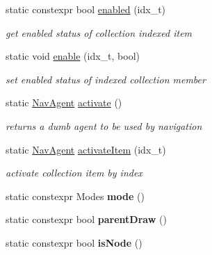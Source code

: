 \begin{DoxyCompactItemize}
static constexpr bool \hyperlink{structEmpty_adc2d105531fb7b43f60fcd9deaaaa71c}{enabled} (idx\+\_\+t)
\begin{DoxyCompactList}\small\item\em get enabled status of collection indexed item \end{DoxyCompactList}\item 
\mbox{\label{structEmpty_af4997efbad97edae86108c77b4b0f26a}} 
static void \hyperlink{structEmpty_af4997efbad97edae86108c77b4b0f26a}{enable} (idx\+\_\+t, bool)
\begin{DoxyCompactList}\small\item\em set enabled status of indexed collection member \end{DoxyCompactList}\item 
\mbox{\label{structEmpty_ade3cccf531dad6fe907c3a9764204e1c}} 
static \hyperlink{structNavAgent}{Nav\+Agent} \hyperlink{structEmpty_ade3cccf531dad6fe907c3a9764204e1c}{activate} ()
\begin{DoxyCompactList}\small\item\em returns a dumb agent to be used by navigation \end{DoxyCompactList}\item 
\mbox{\label{structEmpty_a2f4d5ca0c3193ed070ef49c4dcc9eb5c}} 
static \hyperlink{structNavAgent}{Nav\+Agent} \hyperlink{structEmpty_a2f4d5ca0c3193ed070ef49c4dcc9eb5c}{activate\+Item} (idx\+\_\+t)
\begin{DoxyCompactList}\small\item\em activate collection item by index \end{DoxyCompactList}\item 
\mbox{\label{structEmpty_a8b3d397b1910943820e6bf56c3a6bf5d}} 
static constexpr Modes {\bfseries mode} ()
\item 
\mbox{\label{structEmpty_a5d08fca8ef6cedbd25eb086222e8216d}} 
static constexpr bool {\bfseries parent\+Draw} ()
\item 
\mbox{\label{structEmpty_ac8835019af0108474e5efe926c008d71}} 
static constexpr bool {\bfseries is\+Node} ()
\end{DoxyCompactItemize}
